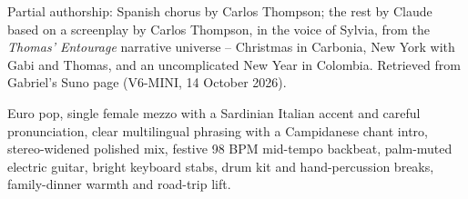 
\begin{notes}
Partial authorship: Spanish chorus by Carlos Thompson; the rest by Claude based on a screenplay by Carlos Thompson, in the voice of Sylvia, from the \emph{Thomas' Entourage} narrative universe -- Christmas in Carbonia, New York with Gabi and Thomas, and an uncomplicated New Year in Colombia. Retrieved from Gabriel's Suno page (V6-MINI, 14 October 2026).
\end{notes}
\begin{style}
Euro pop, single female mezzo with a Sardinian Italian accent and careful pronunciation, clear multilingual phrasing with a Campidanese chant intro, stereo-widened polished mix, festive 98 BPM mid-tempo backbeat, palm-muted electric guitar, bright keyboard stabs, drum kit and hand-percussion breaks, family-dinner warmth and road-trip lift.
\end{style}
